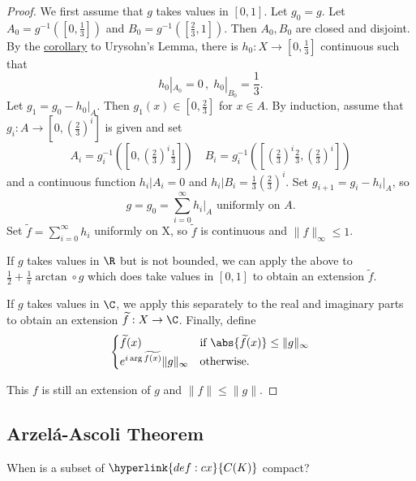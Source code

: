 \documentclass{article}
\begin{document}
\begin{proof}We first assume that $g$ takes values in $[0, 1]$. Let $g_0 = g$.
    Let $A_0 = g^{-1}([0, \frac{1}{3}])$ and $B_0 = g^{-1}([\frac{2}{3}, 1])$. Then $A_0, B_0$ are closed and disjoint.
    By the \hyperlink{cor:urysohnCor}{corollary} to Urysohn's Lemma, there is $h_0: X \to [0, \frac{1}{3}]$ continuous such that
    \begin{equation*}
        h_0|_{A_0} = 0 \, , \; h_0|_{B_0} = \frac{1}{3}.
    \end{equation*}
    Let $g_1 = g_0 - h_0|_A$. Then $g_1(x) \in [0, \frac{2}{3}]$ for $x \in A$.
    By induction, assume that $g_i: A \to [0, (\frac{2}{3})^i]$ is given and set
    \begin{equation*}
        A_i = g_i^{-1} \left(\left[0, \left(\tfrac{2}{3}\right)^i \tfrac{1}{3}\right]\right) \quad B_i = g_i^{-1} \left(\left[\left(\tfrac{2}{3}\right)^i \tfrac{2}{3}, \left(\tfrac{2}{3}\right)^i \right]\right)
    \end{equation*}
    and a continuous function $h_i|A_i = 0$ and $h_i|B_i = \frac{1}{3} (\frac{2}{3})^i$. Set $g_{i+1} = g_i - h_i|_A$, so
    \begin{equation*}
        g = g_0 = \sum_{i=0}^\infty h_i|_A \text{ uniformly on } A.
    \end{equation*}
    Set $\widetilde{f} = \sum_{i=0}^\infty h_i$ uniformly on X, so $\widetilde{f}$ is continuous and $\|f\|_\infty \leq 1$.

    If $g$ takes values in $\R$ but is not bounded, we can apply the above to $\frac{1}{2} + \frac{1}{\pi} \arctan \circ g$ which does take values in $[0, 1]$ to obtain an extension $\widetilde{f}$.

    If $g$ takes values in $\C$, we apply this separately to the real and imaginary parts to obtain an extension $\widetilde{f}:X \to \C$.
    Finally, define
    \begin{equation*}
        \begin{cases}
            \widetilde{f}(x) & \text{if } \abs{\widetilde{f}(x)} \leq \|g\|_\infty \\
            e^{i \arg \widetilde{f(x)}} \|g\|_\infty & \text{otherwise.}
        \end{cases}
    \end{equation*}

    This $f$ is still an extension of $g$ and $\|f\| \leq \|g\|$.
\end{proof}

\subsection{Arzel\'a-Ascoli Theorem}
When is a subset of $\hyperlink{def:cx}{C(K)}$ compact?
\end{document}
